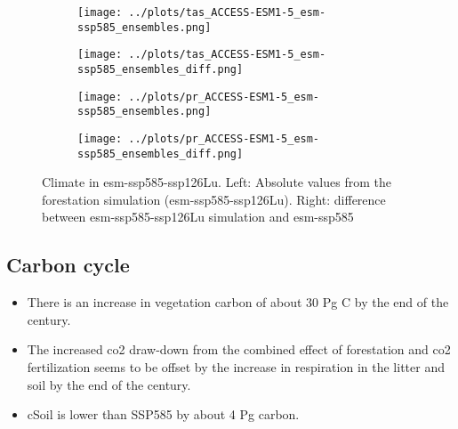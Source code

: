 \documentclass[]{article}
\begin{document}
\begin{figure}[H]
    \centering
    \begin{subfigure}[b]{0.45\linewidth}
        \texttt{[image: ../plots/tas\_ACCESS-ESM1-5\_esm-ssp585\_ensembles.png]}
    \end{subfigure}
    \begin{subfigure}[b]{0.45\linewidth}
        \texttt{[image: ../plots/tas\_ACCESS-ESM1-5\_esm-ssp585\_ensembles\_diff.png]}
    \end{subfigure}
    \begin{subfigure}[b]{0.45\linewidth}
        \texttt{[image: ../plots/pr\_ACCESS-ESM1-5\_esm-ssp585\_ensembles.png]}
    \end{subfigure}
    \begin{subfigure}[b]{0.45\linewidth}
        \texttt{[image: ../plots/pr\_ACCESS-ESM1-5\_esm-ssp585\_ensembles\_diff.png]}
    \end{subfigure}
    \caption{Climate in esm-ssp585-ssp126Lu. Left: Absolute values from the forestation simulation (esm-ssp585-ssp126Lu). Right: difference between esm-ssp585-ssp126Lu simulation and esm-ssp585}
    \label{fig:climate}
\end{figure}

\subsection{Carbon cycle}

\begin{itemize}
    \item There is an increase in vegetation carbon of about 30 Pg C by the end of the century.
    \item The increased co2 draw-down from the combined effect of forestation and co2 fertilization seems to be offset by the increase in respiration in the litter and soil by the end of the century.
    \item cSoil is lower than SSP585 by about 4 Pg carbon.
\end{itemize}
\end{document}
